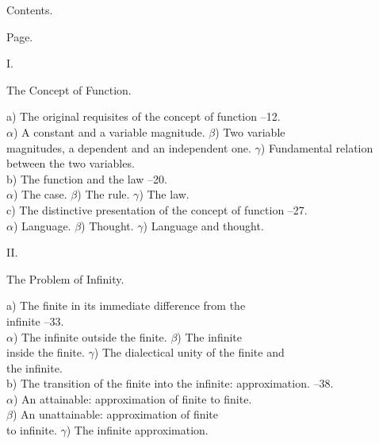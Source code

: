 \documentclass[12pt,a4paper,openany]{book}
\begin{document}
\clearpage
\begin{center}{\large Contents.}\end{center}
{\small{}\par}
{\small\noindent\hfill Page.\\
\par\medskip\centerline{I.}\par\noindent
\par\medskip\centerline{The Concept of Function.}\par\noindent
a) The original requisites of the concept of function --12.\\
$\alpha$) A constant and a variable magnitude. $\beta$) Two variable\\
magnitudes, a dependent and an independent one. $\gamma$) Fundamental relation\\
between the two variables.\\
b) The function and the law --20.\\
$\alpha$) The case. $\beta$) The rule. $\gamma$) The law.\\
c) The distinctive presentation of the concept of function --27.\\
$\alpha$) Language. $\beta$) Thought. $\gamma$) Language and thought.
\par\medskip\centerline{II.}\par\noindent
\par\medskip\centerline{The Problem of Infinity.}\par\noindent
a) The finite in its immediate difference from the\\
infinite --33.\\
$\alpha$) The infinite outside the finite. $\beta$) The infinite\\
inside the finite. $\gamma$) The dialectical unity of the finite and\\
the infinite.\\
b) The transition of the finite into the infinite: approximation. --38.\\
$\alpha$) An attainable: approximation of finite to finite.\\
$\beta$) An unattainable: approximation of finite\\
to infinite. $\gamma$) The infinite approximation.\\
}
\end{document}
